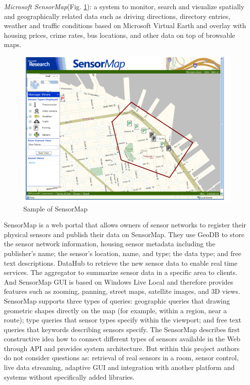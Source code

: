 	\emph{Microsoft SensorMap\cite{10.1109/MC.2007.250,nath2006challenges}}(Fig. \ref{img:sensorMap}): a system to monitor, search and visualize spatially and geographically related data such as driving directions, directory entries, weather and traffic conditions based on Microsoft Virtual Earth and overlay with housing prices, crime rates, bus locations, and other data on top of browsable maps. 
	\begin{figure}[!ht]
		\centering
		\includegraphics[scale=0.5]{Material/examples/SensorMap.png}   
		\caption[Sample of SensorMap]{Sample of SensorMap} 
		\label{img:sensorMap}                 
		\end{figure}
	SensorMap is a web portal that allows owners of sensor networks to register their physical sensors and publish their data on SensorMap. They use GeoDB to store the sensor network information, housing sensor metadata including the publisher's name; the sensor's location, name, and type; the data type; and free text descriptions. DataHub to retrieve the new sensor data to enable real time services. The aggregator to summarize sensor data in a specific area to clients. And SensorMap GUI is based on Windows Live Local and therefore provides features such as zooming, panning, street maps, satellite images, and 3D views. SensorMap supports three types of queries: geographic queries that drawing geometric shapes directly on the map (for example, within a region, near a route); type queries that sensor types specify within the viewport; and free text queries that keywords describing sensors specify. The SensorMap describes first constructive idea how to connect different types of sensors available in the Web through API and provides system architecture. But within this project authors do not consider questions as: retrieval of real sensors in a room, sensor control, live data streaming, adaptive GUI and integration with another platform and systems without specifically added libraries. 

